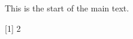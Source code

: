 This is the start of the main text.

\begin{kframe}
\begin{alltt}
 \hlopt{+} 
\end{alltt}
\end{kframe}[1] 2


\break
\singlespacing
\printbibliography
\break


